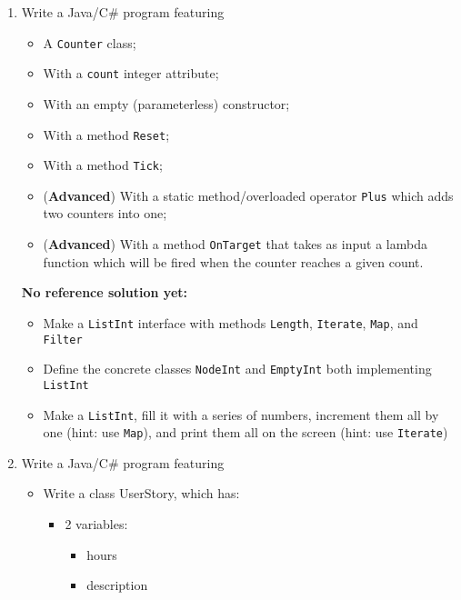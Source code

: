 \begin{enumerate}
            \item Write a Java/C\# program featuring
            \begin{itemize}
                \item A \texttt{Counter} class;
                \item With a \texttt{count} integer attribute;
                \item With an empty (parameterless) constructor;
                \item With a method \texttt{Reset};
                \item With a method \texttt{Tick};
                \item (\textbf{Advanced}) With a static method/overloaded operator \texttt{Plus} which adds two counters into one;
                \item (\textbf{Advanced}) With a method \texttt{OnTarget} that takes as input a lambda function which will be fired when the counter reaches a given count.
            \end{itemize}

	        \textbf{No reference solution yet:}
	        \begin{itemize}
	        	\item Make a \texttt{ListInt} interface with methods \texttt{Length}, \texttt{Iterate}, \texttt{Map}, and \texttt{Filter}
	        	\item Define the concrete classes \texttt{NodeInt} and \texttt{EmptyInt} both implementing \texttt{ListInt}
	        	\item Make a \texttt{ListInt}, fill it with a series of numbers, increment them all by one (hint: use \texttt{Map}), and print them all on the screen (hint: use \texttt{Iterate})
	        \end{itemize}

            \item Write a Java/C\# program featuring
                \begin{itemize}
                    \item Write a class UserStory, which has:
                    \begin{itemize}
                        \item 2 variables:
                            \begin{itemize}
                                \item hours
                                \item description
                            \end{itemize}


\end{itemize}
\end{itemize}
\end{enumerate}

